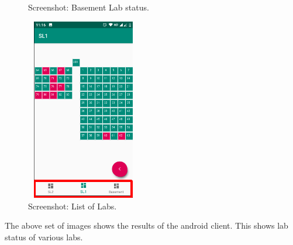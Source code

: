 \documentclass[oneside,a4paper,12pt]{article}
\begin{document}
\begin{figure}[H]
\begin{minipage}{0.46\textwidth}
            \caption{Screenshot: Basement Lab status.}
        \end{minipage}\hfill
        \begin{minipage}{0.46\textwidth}
            \centering
            \includegraphics[width=5cm,height=8cm]{assets/slidebar.png}
            \caption{Screenshot: List of Labs.}
        \end{minipage}\hfill
\end{figure}
The above set of images shows the results of the android client. This shows lab status of various labs.
\end{document}
